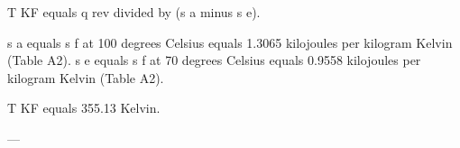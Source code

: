 T KF equals q rev divided by (s a minus s e).  

s a equals s f at 100 degrees Celsius equals 1.3065 kilojoules per kilogram Kelvin (Table A2).  
s e equals s f at 70 degrees Celsius equals 0.9558 kilojoules per kilogram Kelvin (Table A2).  

T KF equals 355.13 Kelvin.  

---